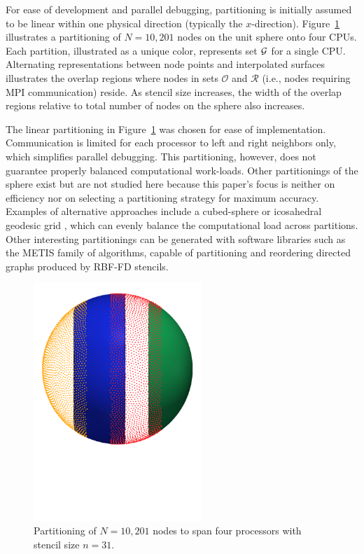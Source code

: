 \documentclass{report}
\begin{document}
For ease of development and parallel debugging, partitioning is initially
assumed to be linear within one physical direction (typically the
$x$-direction). Figure~\ref{fig:decomposed_sphere} illustrates a partitioning of
$N=10,201$ nodes on the unit sphere onto four CPUs. Each partition, illustrated
as a unique color, represents set $\mathcal{G}$ for a single CPU.  Alternating
representations between node points and interpolated surfaces illustrates the
overlap regions where nodes in sets $\mathcal{O}$ and $\mathcal{R}$ (i.e., nodes
requiring MPI communication) reside. As stencil size increases, the width of the
overlap regions relative to total number of nodes on the sphere also increases. 



The linear partitioning in Figure~\ref{fig:decomposed_sphere} was chosen for ease of implementation. Communication is limited for each
processor to left and right neighbors only, which simplifies parallel debugging. This partitioning, however, does not guarantee properly balanced computational work-loads.  Other partitionings of the sphere exist but are not studied here because this paper's focus is neither on efficiency nor on selecting a partitioning strategy for maximum accuracy. Examples of alternative approaches include a cubed-sphere \cite{Ivan2011} or icosahedral geodesic grid \cite{Randall2002}, which can evenly balance the computational load across partitions. Other interesting partitionings can be generated with software libraries such as the METIS \cite{Karypis1999} family of algorithms, capable of partitioning and reordering directed graphs produced by RBF-FD stencils. 

\begin{figure}[ht!]
\begin{center}
\includegraphics[width=2.5in]{../figures/paper1/figures/vortex_rollup/4procs_N10K_n31.pdf}
\caption{Partitioning of $N=10,201$ nodes to span four processors with stencil size $n=31$.  }
\label{fig:decomposed_sphere}
\end{center}
\end{figure}
\end{document}
